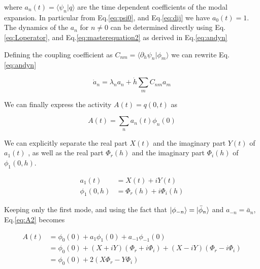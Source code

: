 \documentclass[12pt,twoside]{report}
\begin{document}
where $a_n(t)=\langle \psi_n | q\rangle$ are the time dependent coefficients of the modal expansion. In particular from Eq.\eqref{eq:psi0}, and Eq.\eqref{eq:dij} we have $a_0(t)=1$. The dynamics of the $a_n$ for $n\neq0$ can be determined directly using Eq.\eqref{eq:Loperator}, and Eq.\eqref{eq:masterequation2} as derived in Eq.\eqref{eq:andyn}


Defining the coupling coefficient as $C_{nm}=\langle\partial_h\psi_n|\phi_m \rangle $ we can rewrite Eq.\ref{eq:andyn}

\begin{equation}
\dot{a}_n=\lambda_n a_n +  \dot{h}\sum_mC_{nm}a_m 
\end{equation}

We can finally express the activity $A(t)=q(0,t)$ as

\begin{equation}
\label{eq:A2}
A(t)=\sum_na_n(t)\phi_n(0)
\end{equation}

We can explicitly separate the real part $X(t)$ and the imaginary part  $Y(t)$ of $a_1(t)$ , as well as the real part $\Phi_r(h)$ and the imaginary part $\Phi_i(h)$ of $\phi_1(0,h)$.

\begin{align}
\label{eq:a1xy}
a_1(t)&= X(t) +i Y(t)\\
\phi_1(0,h)&= \Phi_r(h)+i\Phi_i(h)
\end{align}


 Keeping only the first mode, and using the fact that  $\ket{\phi_{-n}}=\ket{\bar{\phi}_n}$ and $a_{-n}=\bar{a}_n$,  Eq.\eqref{eq:A2} becomes

\begin{align}
\label{eq:A3}
A(t)&=\phi_0(0) + a_1\phi_1(0) +a_{-1}\phi_{-1}(0) \nonumber \\
&=\phi_0(0) + \left(X+iY\right)\left(\Phi_r+i\Phi_i\right)+\left(X-iY\right)\left(\Phi_r-i\Phi_i\right)\nonumber \\
&=\phi_0(0) + 2\left(X\Phi_r- Y\Phi_i\right)
\end{align}
\end{document}
